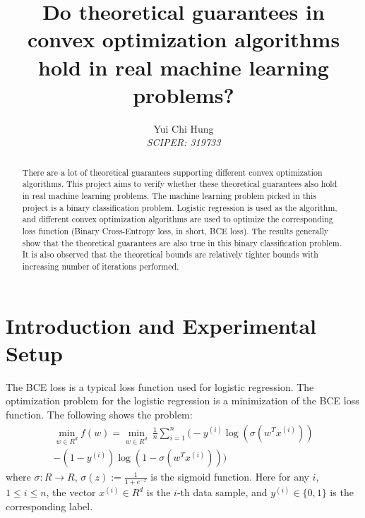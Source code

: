 \documentclass[10pt,conference,compsocconf]{IEEEtran}
\begin{document}
\title{Do theoretical guarantees in convex optimization algorithms hold in real machine learning problems?}

\author{
  Yui Chi Hung\\
  \textit{SCIPER: 319733}
}

\maketitle

\begin{abstract}
  There are a lot of theoretical guarantees supporting different convex optimization algorithms. This project aims to verify whether these theoretical guarantees also hold in real machine learning problems. The machine learning problem picked in this project is a binary classification problem. Logistic regression is used as the algorithm, and different convex optimization algorithms are used to optimize the corresponding loss function (Binary Cross-Entropy loss, in short, BCE loss). The results generally show that the theoretical guarantees are also true in this binary classification problem. It is also observed that the theoretical bounds are relatively tighter bounds with increasing number of iterations performed.
\end{abstract}

\section{Introduction and Experimental Setup}

The BCE loss is a typical loss function used for logistic regression. The optimization problem for the logistic regression is a minimization of the BCE loss function. The following shows the problem:
\begin{multline}
\min_{w \in R^d} f(w) = \min_{w \in R^d} \  \frac{1}{n}\sum_{i=1}^n \big( -y^{(i)}\log(\sigma(w^T x^{(i)}))\\
-(1-y^{(i)})\log(1-\sigma(w^T x^{(i)})) \big)
\end{multline}
where $\sigma : R\rightarrow R$, $\sigma(z) := \frac{1}{1+e^{-z}}$ is the sigmoid function.
Here for any $i$, $1\le i\le n$, the vector $x^{(i)}\in R^d$ is the $i$-th data sample, and $y^{(i)}\in\{0,1\}$ is the corresponding label.\par
\end{document}
